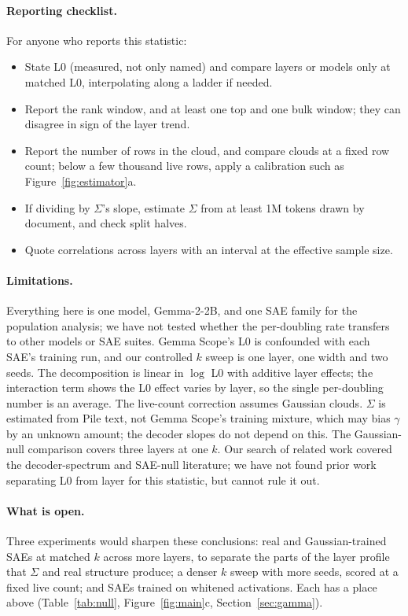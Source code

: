\documentclass[10pt,twocolumn]{article}
\newcommand{\gam}{\gamma}
\begin{document}
\paragraph{Reporting checklist.} For anyone who reports this statistic:
\begin{itemize}
\setlength{\itemsep}{0pt}
\item State L0 (measured, not only named) and compare layers or models only at matched L0, interpolating along a ladder if needed.
\item Report the rank window, and at least one top and one bulk window; they can disagree in sign of the layer trend.
\item Report the number of rows in the cloud, and compare clouds at a fixed row count; below a few thousand live rows, apply a calibration such as Figure~\ref{fig:estimator}a.
\item If dividing by $\Sigma$'s slope, estimate $\Sigma$ from at least 1M tokens drawn by document, and check split halves.
\item Quote correlations across layers with an interval at the effective sample size.
\end{itemize}

\paragraph{Limitations.} Everything here is one model, Gemma-2-2B, and one SAE family for the population analysis; we have not tested whether the per-doubling rate transfers to other models or SAE suites. Gemma Scope's L0 is confounded with each SAE's training run, and our controlled $k$ sweep is one layer, one width and two seeds. The decomposition is linear in $\log$ L0 with additive layer effects; the interaction term shows the L0 effect varies by layer, so the single per-doubling number is an average. The live-count correction assumes Gaussian clouds. $\Sigma$ is estimated from Pile text, not Gemma Scope's training mixture, which may bias $\gam$ by an unknown amount; the decoder slopes do not depend on this. The Gaussian-null comparison covers three layers at one $k$. Our search of related work covered the decoder-spectrum and SAE-null literature; we have not found prior work separating L0 from layer for this statistic, but cannot rule it out.

\paragraph{What is open.} Three experiments would sharpen these conclusions: real and Gaussian-trained SAEs at matched $k$ across more layers, to separate the parts of the layer profile that $\Sigma$ and real structure produce; a denser $k$ sweep with more seeds, scored at a fixed live count; and SAEs trained on whitened activations. Each has a place above (Table~\ref{tab:null}, Figure~\ref{fig:main}c, Section~\ref{sec:gamma}).
\end{document}
